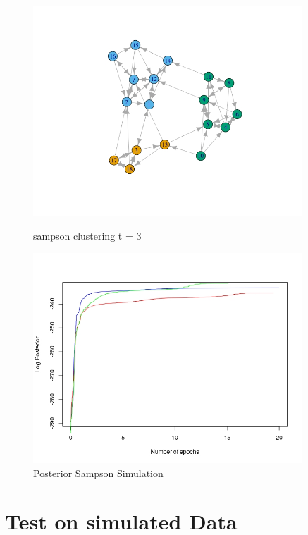 \documentclass[12pt]{ociamthesis}  %
\begin{document}
	\begin{figure}[H]
		\centering
		\begin{minipage}{0.45\textwidth}
			\centering
			\includegraphics[width=0.9\textwidth]{sampsonEM3} %
			\caption{sampson clustering t = 3}
			\label{label-image21}
		\end{minipage}\hfill
		\begin{minipage}{0.45\textwidth}
			\centering
			\includegraphics[width=0.9\textwidth]{posteriorSampson} %
			\caption{Posterior Sampson Simulation}
			\label{label-image22}
		\end{minipage}
	\end{figure}
	
	\chapter{Test on simulated Data}
	
\end{document}
